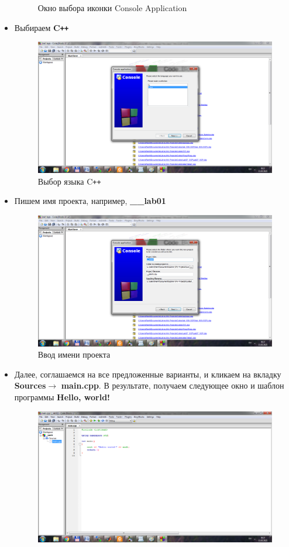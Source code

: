 \begin{itemize}
\begin{figure}[H]
        \caption{Окно выбора иконки Console Application}
        \label{CodeBlocks-2}
    \end{figure}
    \item Выбираем \textbf{C\texttt{++}}
    \begin{figure}[H]
        \centering
        \includegraphics[width=.9\linewidth]{figures/CodeBlocks-3.png}
        \caption{Выбор языка C\texttt{++}}
        \label{CodeBlocks-3}
    \end{figure}
    \item Пишем имя проекта, например, \textbf{\_\_lab01}
    \begin{figure}[H]
        \centering
        \includegraphics[width=.9\linewidth]{figures/CodeBlocks-4.png}
        \caption{Ввод имени проекта}
        \label{CodeBlocks-4}
    \end{figure}
    \item Далее, соглашаемся на все предложенные варианты, и кликаем на вкладку \textbf{Sources}$\rightarrow$ \textbf{main.cpp}. В результате, получаем следующее окно и шаблон программы \textbf{Hello, world!}
    \begin{figure}[H]
        \centering
        \includegraphics[width=.9\linewidth]{figures/CodeBlocks-5.png}

\end{figure}
\end{itemize}
